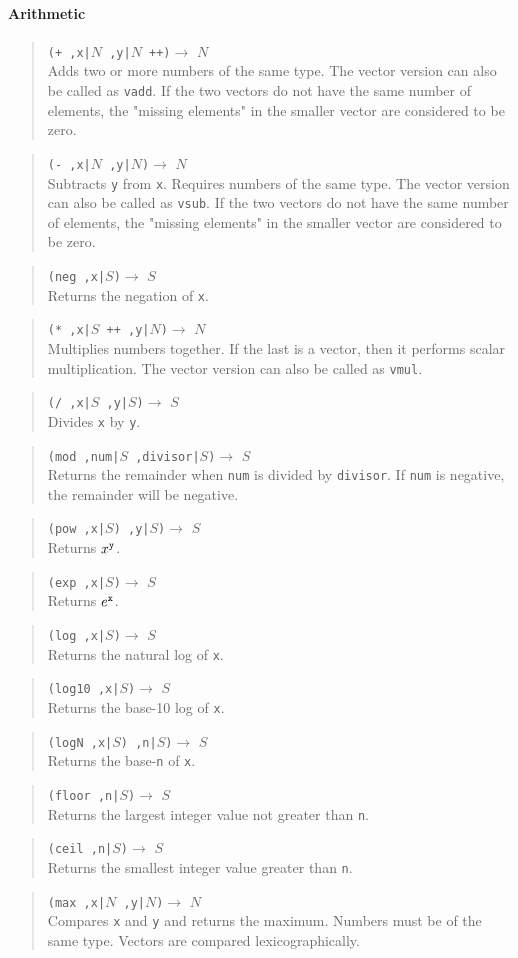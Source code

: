 \documentclass{article}
\newcommand\function[3]
{\begin{quote}{\tt #1}$\rightarrow$ \type{#2} \\ #3 \end{quote}}
\newcommand\type[1]{$#1$}
\newcommand\var[1]{{\tt #1}}
\begin{document}
\paragraph{Arithmetic}
\function{(+ ,x|\type{N} ,y|\type{N} ++)}{N}{Adds two or more numbers
  of the same type.  The vector version can also be called as
  \var{vadd}. If the two vectors do not have the same number of elements, the "missing elements" in the smaller vector are considered to be zero.}
\function{(- ,x|\type{N} ,y|\type{N})}{N}{Subtracts \var{y} from
  \var{x}.  Requires numbers of the same type.  The vector version can
  also be called as \var{vsub}. If the two vectors do not have the same number of elements, the "missing elements" in the smaller vector are considered to be zero.}
\function{(neg ,x|\type{S})}{S}{Returns the negation of \var{x}.}
\function{(* ,x|\type{S} ++ ,y|\type{N})}{N}{Multiplies numbers
  together.  If the last is a vector, then it performs scalar
  multiplication.  The vector version can also be called as
  \var{vmul}.}

\function{(/ ,x|\type{S} ,y|\type{S})}{S}{Divides \var{x} by \var{y}.}

\function{(mod ,num|\type{S} ,divisor|\type{S})}{S}{Returns the remainder
  when \var{num} is divided by \var{divisor}.  If \var{num} is negative,
  the remainder will be negative.}

\function{(pow ,x|\type{S}) ,y|\type{S})}{S}{Returns $x^{\var{y}}$.}
\function{(exp ,x|\type{S})}{S}{Returns $e^{\var{x}}$.}
\function{(log ,x|\type{S})}{S}{Returns the natural log of {\var{x}}.}
\function{(log10 ,x|\type{S})}{S}{Returns the base-10 log of {\var{x}}.}
\function{(logN ,x|\type{S}) ,n|\type{S})}{S}{Returns the base-{\var{n}} of {\var{x}}.}

\function{(floor ,n|\type{S})}{S}{Returns the largest integer value not greater than \var{n}.}
\function{(ceil ,n|\type{S})}{S}{Returns the smallest integer value greater than \var{n}.}

\function{(max ,x|\type{N} ,y|\type{N})}{N}{Compares 
  \var{x} and \var{y} and returns the maximum.  Numbers must be of
  the same type.  Vectors are compared lexicographically.}
\end{document}
